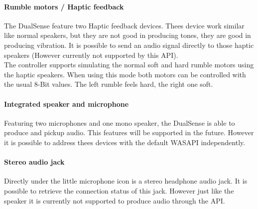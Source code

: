\paragraph{Rumble motors / Haptic feedback}
The DualSense feature two Haptic feedback devices. Thees device work similar like normal speakers, but they are not good in producing tones, they are good in producing vibration. It is possible to send an audio signal directly to those haptic speakers (However currently not supported by this API).\\
The controller supports simulating the normal soft and hard rumble motors using the haptic speakers. When using this mode both motors can be controlled with the usual 8-Bit values. The left rumble feels hard, the right one soft.

\paragraph{Integrated speaker and microphone}
Featuring two microphones and one mono speaker, the DualSense is able to produce and pickup audio. This features will be supported in the future. However it is possible to address thees devices with the default WASAPI independently. 

\paragraph{Stereo audio jack}
Directly under the little microphone icon is a stereo headphone audio jack. It is possible to retrieve the connection status of this jack. However just like the speaker it is currently not supported to produce audio through the API.

\newpage